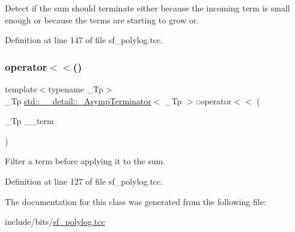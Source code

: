 Detect if the sum should terminate either because the incoming term is small enough or because the terms are starting to grow or. 



Definition at line 147 of file sf\+\_\+polylog.\+tcc.

\mbox{\label{classstd_1_1____detail_1_1__AsympTerminator_a7299b3abc814127eba98d16f6ac7d4e1}} 
\subsubsection{\texorpdfstring{operator$<$$<$()}{operator<<()}}
{\footnotesize\ttfamily template$<$typename \+\_\+\+Tp$>$ \\
\+\_\+\+Tp \hyperlink{classstd_1_1____detail_1_1__AsympTerminator}{std\+::\+\_\+\+\_\+detail\+::\+\_\+\+Asymp\+Terminator}$<$ \+\_\+\+Tp $>$\+::operator$<$$<$ (\begin{DoxyParamCaption}\item[{\+\_\+\+Tp}]{\+\_\+\+\_\+term }\end{DoxyParamCaption})\hspace{0.3cm}{\ttfamily [inline]}}



Filter a term before applying it to the sum. 



Definition at line 127 of file sf\+\_\+polylog.\+tcc.



The documentation for this class was generated from the following file\+:\begin{DoxyCompactItemize}
\item 
include/bits/\hyperlink{sf__polylog_8tcc}{sf\+\_\+polylog.\+tcc}\end{DoxyCompactItemize}
